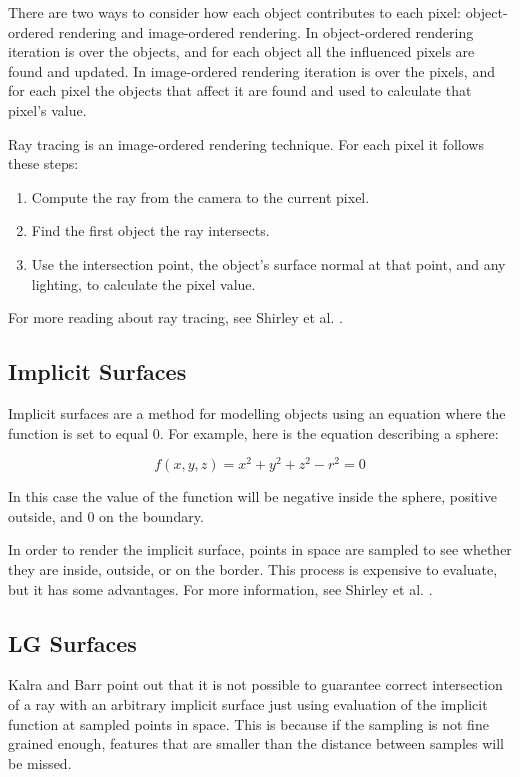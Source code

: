 \documentclass[conference]{acmsiggraph}
\begin{document}
There are two ways to consider how each object contributes to each 
pixel: object-ordered rendering and image-ordered rendering.  In
object-ordered rendering iteration is over the objects, and for
each object all the influenced pixels are found and updated.  In
image-ordered rendering iteration is over the pixels, and for each
pixel the objects that affect it are found and used to calculate
that pixel's value.

Ray tracing is an image-ordered rendering technique.  For each pixel
it follows these steps:
\begin{enumerate}
	\item Compute the ray from the camera to the current pixel.
	\item Find the first object the ray intersects.
	\item Use the intersection point, the object's surface normal at that
	point, and any lighting, to calculate the pixel value.
\end{enumerate}

For more reading about ray tracing, see Shirley et al. \cite{Shirley}.

\subsection{Implicit Surfaces}

Implicit surfaces are a method for modelling objects using an equation
where the function is set to equal 0.  For example, here is the 
equation describing a sphere:

\begin{equation}
f(x, y, z) = x^2 + y^2 + z^2 - r^2 = 0
\end{equation}

In this case the value of the function will be negative inside the 
sphere, positive outside, and 0 on the boundary.

In order to render the implicit surface, points in space are sampled
to see whether they are inside, outside, or on the border.  This process
is expensive to evaluate, but it has some advantages.  For more information,
see Shirley et al. \cite{Shirley}.

\subsection{LG Surfaces}

Kalra and Barr \cite{KalraBarr1989} point out that it is not possible to
guarantee correct intersection of a ray with an arbitrary implicit surface
just using evaluation of the implicit function at sampled points in space.
This is because if the sampling is not fine grained enough, features that
are smaller than the distance between samples will be missed.
\end{document}
